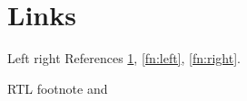 \documentclass{article}
\begin{document}
\section{Links}\label{sec:link}
Left right
References \ref{sec:link}, \ref{fn:left}, \ref{fn:right}.
\begin{RTL}RTL footnote and\end{RTL}
\end{document}
